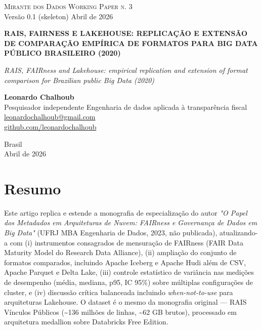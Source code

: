 \documentclass[12pt,a4paper,oneside]{article}
\begin{document}
\begin{titlepage}
  \begin{center}
    \vspace*{1.5cm}
    {\small\textsc{Mirante dos Dados \quad\textbar\quad Working Paper n. 3}}\\
    {\small Versão 0.1 (skeleton) \textemdash{} Abril de 2026}

    \vfill

    {\LARGE\bfseries
     RAIS, FAIRNESS E LAKEHOUSE: REPLICAÇÃO E EXTENSÃO DE COMPARAÇÃO
     EMPÍRICA DE FORMATOS PARA BIG DATA PÚBLICO BRASILEIRO
     (2020)}

    \vspace{1cm}
    {\large\itshape
     RAIS, FAIRness and Lakehouse: empirical replication and extension
     of format comparison for Brazilian public Big Data (2020)}

    \vfill

    {\large\textbf{Leonardo Chalhoub}}\\[4pt]
    {\small Pesquisador independente \textemdash{} Engenharia de dados aplicada à transparência fiscal}\\[2pt]
    {\small\href{mailto:leonardochalhoub@gmail.com}{leonardochalhoub@gmail.com}}\\
    {\small\href{https://github.com/leonardochalhoub}{github.com/leonardochalhoub}}

    \vfill

    {\small Brasil \\ Abril de 2026}
  \end{center}
\end{titlepage}

\section*{Resumo}
Este artigo replica e estende a monografia de especialização do autor
\textit{"O Papel dos Metadados em Arquiteturas de Nuvem: FAIRness e
Governança de Dados em Big Data"} (UFRJ MBA Engenharia de Dados, 2023,
não publicada), atualizando-a com (i) instrumentos consagrados de
mensuração de FAIRness (FAIR Data Maturity Model do Research Data
Alliance), (ii) ampliação do conjunto de formatos comparados,
incluindo Apache Iceberg e Apache Hudi além de CSV, Apache Parquet e
Delta Lake, (iii) controle estatístico de variância nas medições de
desempenho (média, mediana, p95, IC 95\%) sobre múltiplas configurações
de cluster, e (iv) discussão crítica balanceada incluindo
\textit{when-not-to-use} para arquiteturas Lakehouse. O dataset é o
mesmo da monografia original — RAIS Vínculos Públicos
(\textasciitilde{}136 milhões de linhas, \textasciitilde{}62 GB
brutos), processado em arquitetura medallion sobre Databricks Free
Edition.
\end{document}
